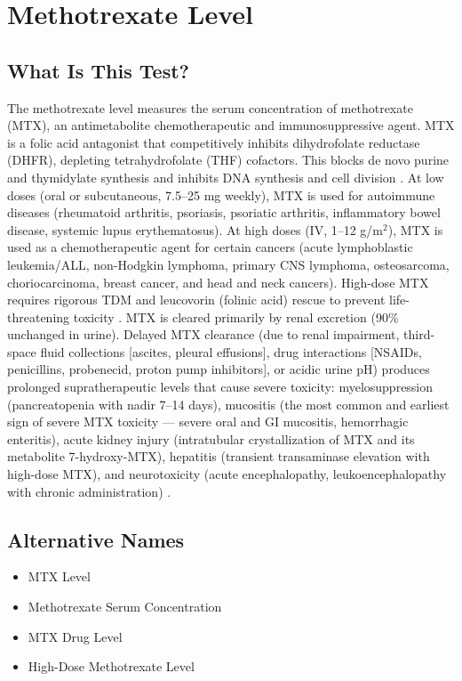 \chapter{Methotrexate Level}
\section*{What Is This Test?}
The methotrexate level measures the serum concentration of methotrexate (MTX), an antimetabolite chemotherapeutic and immunosuppressive agent. MTX is a folic acid antagonist that competitively inhibits dihydrofolate reductase (DHFR), depleting tetrahydrofolate (THF) cofactors. This blocks de novo purine and thymidylate synthesis and inhibits DNA synthesis and cell division \cite{bleyer1978clinical}. At low doses (oral or subcutaneous, 7.5--25 mg weekly), MTX is used for autoimmune diseases (rheumatoid arthritis, psoriasis, psoriatic arthritis, inflammatory bowel disease, systemic lupus erythematosus). At high doses (IV, 1--12 g/m$^2$), MTX is used as a chemotherapeutic agent for certain cancers (acute lymphoblastic leukemia/ALL, non-Hodgkin lymphoma, primary CNS lymphoma, osteosarcoma, choriocarcinoma, breast cancer, and head and neck cancers). High-dose MTX requires rigorous TDM and leucovorin (folinic acid) rescue to prevent life-threatening toxicity \cite{jolivet1983pharmacology}. MTX is cleared primarily by renal excretion (90\% unchanged in urine). Delayed MTX clearance (due to renal impairment, third-space fluid collections [ascites, pleural effusions], drug interactions [NSAIDs, penicillins, probenecid, proton pump inhibitors], or acidic urine pH) produces prolonged supratherapeutic levels that cause severe toxicity: myelosuppression (pancreatopenia with nadir 7--14 days), mucositis (the most common and earliest sign of severe MTX toxicity --- severe oral and GI mucositis, hemorrhagic enteritis), acute kidney injury (intratubular crystallization of MTX and its metabolite 7-hydroxy-MTX), hepatitis (transient transaminase elevation with high-dose MTX), and neurotoxicity (acute encephalopathy, leukoencephalopathy with chronic administration) \cite{howard2016preventing}.
\section*{Alternative Names}
\begin{itemize}
  \item MTX Level
  \item Methotrexate Serum Concentration
  \item MTX Drug Level
  \item High-Dose Methotrexate Level
\end{itemize}
